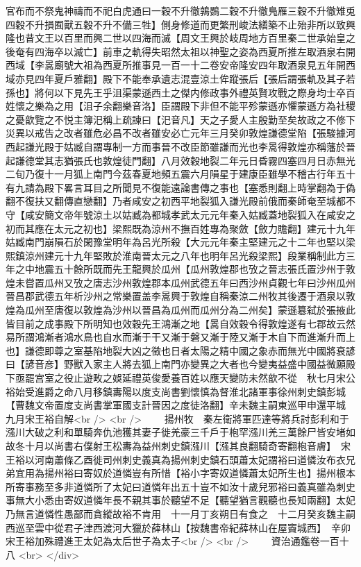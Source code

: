 官布而不祭鬼神禱而不祀白虎通曰一穀不升徹鶉鷃二穀不升徹鳬雁三穀不升徹雉兎四穀不升損囿獸五穀不升不備三牲】側身修道而更繁刑峻法繕築不止殆非所以致興隆也昔文王以百里而興二世以四海而滅【周文王興於岐周地方百里秦二世承始皇之後奄有四海卒以滅亡】前車之軌得失昭然太祖以神聖之姿為西夏所推左取酒泉右開西域【李暠廟號大祖為西夏所推事見一百一十二卷安帝隆安四年取酒泉見五年開西域亦見四年夏戶雅翻】殿下不能奉承遺志混壹涼土侔蹤張后【張后謂張軌及其子若孫也】將何以下見先王乎沮渠蒙遜西土之傑内修政事外禮英賢攻戰之際身均士卒百姓懷之樂為之用【沮子余翻樂音洛】臣謂殿下非但不能平殄蒙遜亦懼蒙遜方為社稷之憂歆覽之不悦主簿汜稱上疏諫曰【汜音凡】天之子愛人主殷勤至矣故政之不修下災異以戒告之改者雖危必昌不改者雖安必亡元年三月癸卯敦煌謙德堂陷【張駿據河西起謙光殿于姑臧自謂專制一方而事晉不改臣節雖謙而光也李暠得敦煌亦稱藩於晉起謙德堂其志猶張氏也敦煌徒門翻】八月效穀地裂二年元日昏霧四塞四月日赤無光二旬乃復十一月狐上南門今茲春夏地頻五震六月隕星于建康臣雖學不稽古行年五十有九請為殿下畧言耳目之所聞見不復能遠論書傳之事也【塞悉則翻上時掌翻為于偽翻不復扶又翻傳直戀翻】乃者咸安之初西平地裂狐入謙光殿前俄而秦師奄至城都不守【咸安簡文帝年號涼土以姑臧為都城孝武太元元年秦入姑臧蓋地裂狐入在咸安之初而其應在太元之初也】梁熙既為涼州不撫百姓專為聚斂【斂力贍翻】建元十九年姑臧南門崩隕石於閑豫堂明年為呂光所殺【大元元年秦主堅建元之十二年也堅以梁熙鎮涼州建元十九年堅敗於淮南晉太元之八年也明年呂光殺梁熙】段業稱制此方三年之中地震五十餘所既而先王龍興於瓜州【瓜州敦煌郡也攷之晉志張氏置沙州于敦煌未嘗置瓜州又攷之唐志沙州敦煌郡本瓜州武德五年曰西沙州貞觀七年曰沙州瓜州晉昌郡武德五年析沙州之常樂置盖李暠興于敦煌自稱秦涼二州牧其後遷于酒泉以敦煌為瓜州至唐復以敦煌為沙州以晉昌為瓜州而瓜州分為二州矣】蒙遜簒弑於張掖此皆目前之成事殿下所明知也效穀先王鴻漸之地【暠自效穀令得敦煌遂有七郡故云然易所謂鴻漸者鴻水鳥也自水而漸于干又漸于磐又漸于陸又漸于木自下而進漸升而上也】謙德即尊之室基陷地裂大凶之徵也日者太陽之精中國之象赤而無光中國將衰諺曰【諺音彦】野獸入家主人將去狐上南門亦變異之大者也今變夷益盛中國益微願殿下亟罷宫室之役止遊畋之娛延禮英俊愛養百姓以應天變防未然歆不從　秋七月宋公裕始受進爵之命八月移鎮夀陽以度支尚書劉懷慎為督淮北諸軍事徐州刺史鎮彭城【曹魏文帝置度支尚書掌軍國支計晉因之度徒洛翻】辛未魏主嗣東巡甲申還平城　九月宋王裕自解<br />
<br />
　　揚州牧　秦左衛將軍匹達等將兵討彭利和于漒川大破之利和單騎奔仇池獲其妻子徙羌豪三千戶于枹罕漒川羌三萬餘尸皆安堵如故冬十月以尚書右僕射王松夀為益州刺史鎮漒川【漒其良翻騎奇寄翻枹音膚】　宋王裕以河南蕭條乙酉徙司州刺史義真為揚州刺史鎮石頭蕭太妃謂裕曰道憐汝布衣兄弟宜用為揚州裕曰寄奴於道憐豈有所惜【裕小字寄奴道憐蕭太妃所生也】揚州根本所寄事務至多非道憐所了太妃曰道憐年出五十豈不如汝十歲兒邪裕曰義真雖為刺史事無大小悉由寄奴道憐年長不親其事於聽望不足【聽望猶言觀聽也長知兩翻】太妃乃無言道憐性愚鄙而貪縱故裕不肯用　十一月丁亥朔日有食之　十二月癸亥魏主嗣西巡至雲中從君子津西渡河大獵於薛林山【按魏書帝紀薛林山在屋竇城西】　辛卯宋王裕加殊禮進王太妃為太后世子為太子<br />
<br />
　　資治通鑑卷一百十八  <br>
   </div> 


